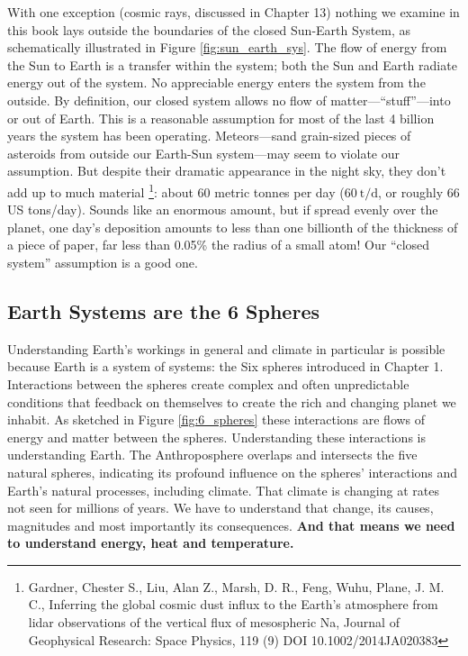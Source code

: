 With one exception (cosmic rays, discussed in Chapter 13) nothing we examine in this book lays outside the boundaries of the closed Sun-Earth System, as schematically illustrated in Figure \ref{fig:sun_earth_sys}. The flow of energy from the Sun to Earth is a transfer within the system; both the Sun and Earth radiate energy out of the system. No appreciable energy enters the system from the outside. By definition, our closed system allows no flow of matter---``stuff''---into or out of Earth. This is a reasonable assumption for most of the last 4 billion years the system has been operating. Meteors---sand grain-sized pieces of asteroids from outside our Earth-Sun system---may seem to violate our assumption. But despite their dramatic appearance in the night sky, they don't add up to much material \footnote{Gardner, Chester S., Liu, Alan Z., Marsh, D. R., Feng, Wuhu, Plane, J. M. C., Inferring the global cosmic dust influx to the Earth's atmosphere from lidar observations of the vertical flux of mesospheric Na, Journal of Geophysical Research: Space Physics, 119 (9) DOI 10.1002/2014JA020383}: about 60 metric tonnes per day ($\SI{60}{\tonne\per\day}$, or roughly 66 US tons/day). Sounds like an enormous amount, but if spread evenly over the planet, one day's deposition amounts to less than one billionth of the thickness of a piece of paper, far less than 0.05\% the radius of a small atom! Our ``closed system'' assumption is a good one.

\subsection{Earth Systems are the 6 Spheres}
Understanding Earth's workings in general and climate in particular is possible because Earth is a system of systems: the Six spheres introduced in Chapter 1. Interactions between the spheres create complex and often unpredictable conditions that feedback on themselves to create the rich and changing planet we inhabit. As sketched in Figure \ref{fig:6_spheres} these interactions are flows of energy and matter between the spheres. Understanding these interactions is understanding Earth. The Anthroposphere overlaps and intersects the five natural spheres, indicating its profound influence on the spheres' interactions and Earth's natural processes, including climate. That climate is changing at rates not seen for millions of years. We have to understand that change, its causes, magnitudes and most importantly its consequences. \textbf{And that means we need to understand energy, heat and temperature.}

